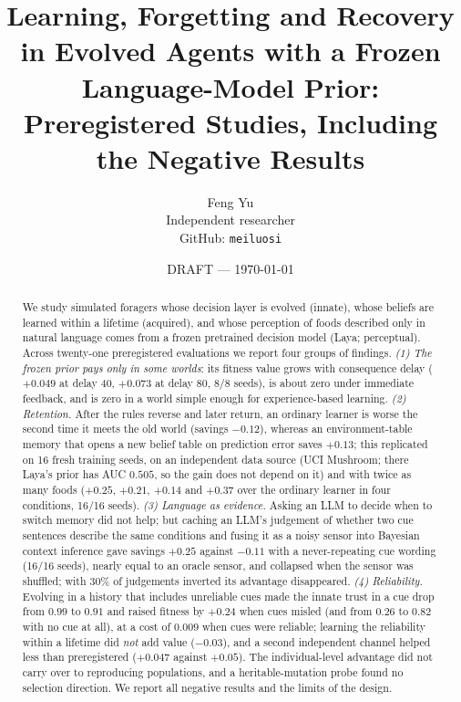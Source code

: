 \documentclass[11pt]{article}
\title{Learning, Forgetting and Recovery in Evolved Agents with a Frozen Language-Model Prior:\\ Preregistered Studies, Including the Negative Results}
\author{Feng Yu\\ Independent researcher\\ GitHub: \texttt{meiluosi}}
\date{DRAFT --- \today}
\begin{document}
\maketitle

\begin{abstract}
We study simulated foragers whose decision layer is evolved (innate), whose beliefs are learned within a lifetime (acquired), and whose perception of foods described only in natural language comes from a frozen pretrained decision model (Laya; perceptual). Across twenty-one preregistered evaluations we report four groups of findings. \emph{(1) The frozen prior pays only in some worlds}: its fitness value grows with consequence delay ($+0.049$ at delay 40, $+0.073$ at delay 80, 8/8 seeds), is about zero under immediate feedback, and is zero in a world simple enough for experience-based learning. \emph{(2) Retention.} After the rules reverse and later return, an ordinary learner is worse the second time it meets the old world (savings $-0.12$), whereas an environment-table memory that opens a new belief table on prediction error saves $+0.13$; this replicated on 16 fresh training seeds, on an independent data source (UCI Mushroom; there Laya's prior has AUC $0.505$, so the gain does not depend on it) and with twice as many foods ($+0.25$, $+0.21$, $+0.14$ and $+0.37$ over the ordinary learner in four conditions, 16/16 seeds). \emph{(3) Language as evidence.} Asking an LLM to decide when to switch memory did not help; but caching an LLM's judgement of whether two cue sentences describe the same conditions and fusing it as a noisy sensor into Bayesian context inference gave savings $+0.25$ against $-0.11$ with a never-repeating cue wording (16/16 seeds), nearly equal to an oracle sensor, and collapsed when the sensor was shuffled; with 30\% of judgements inverted its advantage disappeared. \emph{(4) Reliability.} Evolving in a history that includes unreliable cues made the innate trust in a cue drop from $0.99$ to $0.91$ and raised fitness by $+0.24$ when cues misled (and from $0.26$ to $0.82$ with no cue at all), at a cost of $0.009$ when cues were reliable; learning the reliability within a lifetime did \emph{not} add value ($-0.03$), and a second independent channel helped less than preregistered ($+0.047$ against $+0.05$). The individual-level advantage did not carry over to reproducing populations, and a heritable-mutation probe found no selection direction. We report all negative results and the limits of the design.
\end{abstract}
\end{document}
